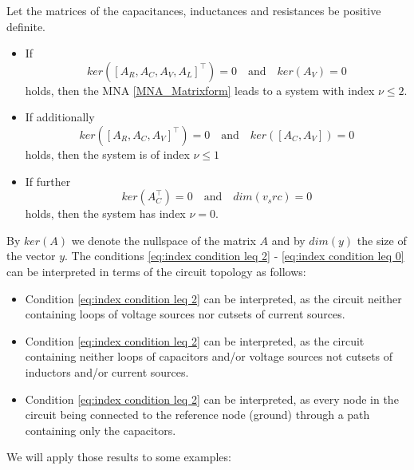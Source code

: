 \begin{theorem}
	Let the matrices of the capacitances, inductances and resistances be positive definite.
	\begin{itemize}
		\item If
		\begin{equation}
			\label{eq:index condition leq 2}
			ker([A_R, A_C, A_V, A_L]^\top) = 0 \quad \text{and} \quad ker(A_V) = 0
		\end{equation}
		holds, then the MNA \eqref{MNA_Matrixform} leads to a system with index $\nu \leq 2$.
		
		\item If additionally
		\begin{equation}
			\label{eq:index condition leq 1}
			ker([A_R, A_C, A_V]^\top) = 0 \quad \text{and} \quad ker([A_C, A_V]) = 0
		\end{equation}
		holds, then the system is of index $\nu \leq 1$
		
		\item If further
		\begin{equation}
			\label{eq:index condition eq 0}
			ker(A_C^\top) = 0 \quad \text{and} \quad dim(v_src) = 0
		\end{equation}
		holds, then the system has index $\nu = 0$.
	\end{itemize}
\end{theorem}

By $ker(A)$ we denote the nullspace of the matrix $A$ and by $dim(y)$ the size of the vector $y$. The conditions \eqref{eq:index condition leq 2} - \eqref{eq:index condition leq 0} can be interpreted in terms of the circuit topology as follows:
\begin{itemize}
	\item Condition \eqref{eq:index condition leq 2} can be interpreted, as the circuit neither containing loops of voltage sources nor cutsets of current sources.
	\item Condition \eqref{eq:index condition leq 2} can be interpreted, as the circuit containing neither loops of capacitors and/or voltage sources not cutsets of inductors and/or current sources.
	\item Condition \eqref{eq:index condition leq 2} can be interpreted, as every node in the circuit being connected to the reference node (ground) through a path containing only the capacitors.
\end{itemize}

We will apply those results to some examples: 

